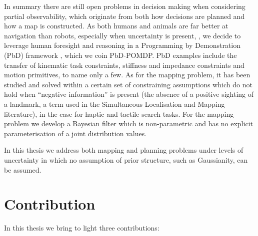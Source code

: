 In summary there are still open problems in decision making when considering partial observability, which 
originate from both how decisions are planned and how a map is constructed.
As both humans and animals are far better at navigation than robots, especially when uncertainty is present, 
\citep{stankiewicz2006lost}, we decide to leverage human foresight and reasoning in a Programming by Demonstration 
(PbD) framework \citep{Billard08chapter}, which we coin PbD-POMDP. PbD examples include the transfer of kinematic task constraints, 
stiffness and impedance constraints and motion primitives, to name only a few. As for the mapping problem, it has been studied 
and solved within a certain set of constraining assumptions which do not hold when ``negative information'' is present (the absence of a positive 
sighting of a landmark, a term used in the Simultaneous Localisation and Mapping literature), in the case for haptic and tactile search tasks. For the mapping problem we develop a 
Bayesian filter which is non-parametric and has no explicit parameterisation of a joint distribution values.

In this thesis we address both mapping and planning problems under levels of uncertainty in which no assumption of prior structure, 
such as Gaussianity, can be assumed. 



\section{Contribution}
%	
%

In this thesis we bring to light three contributions:


